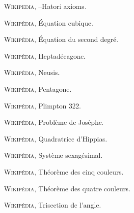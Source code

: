 \begin{thebibliography}{99}
    
  
 















\textsc{Wikipedia}, –{Hatori} axioms\fg.





\textsc{Wikipédia}, \og Équation cubique\fg.

\textsc{Wikipédia}, \og Équation du second degré\fg.


 \textsc{Wikipédia}, \og Heptadécagone\fg.


\textsc{Wikipédia}, \og Neusis\fg.

  
\textsc{Wikipédia}, \og Pentagone\fg.

\textsc{Wikipédia}, \og Plimpton 322\fg.

\textsc{Wikipédia}, \og Problème de {J}osèphe\fg.


\textsc{Wikipédia}, \og Quadratrice d'{Hippias}\fg.

\textsc{Wikipédia}, \og Système sexagésimal\fg.




\textsc{Wikipédia}, \og Théorème des cinq couleurs\fg.


\textsc{Wikipédia}, \og Théorème des quatre couleurs\fg.



    


\textsc{Wikipédia}, \og Trisection de l'angle\fg.



  



  

  

  











  

\end{thebibliography}